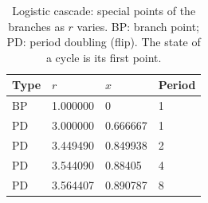 \begin{table}
\centering
\caption{Logistic cascade: special points of the branches as $r$ varies. BP: branch point; PD: period doubling (flip). The state of a cycle is its first point.}
\label{tab:logistic-cascade-special-points}
\begin{tabular}{@{}llll@{}}
\toprule
Type & $r$ & $x$ & Period \\
\midrule
BP & \num{1.000000} & \num{0} & \num{1} \\
PD & \num{3.000000} & \num{0.666667} & \num{1} \\
PD & \num{3.449490} & \num{0.849938} & \num{2} \\
PD & \num{3.544090} & \num{0.88405} & \num{4} \\
PD & \num{3.564407} & \num{0.890787} & \num{8} \\
\bottomrule
\end{tabular}
\end{table}
